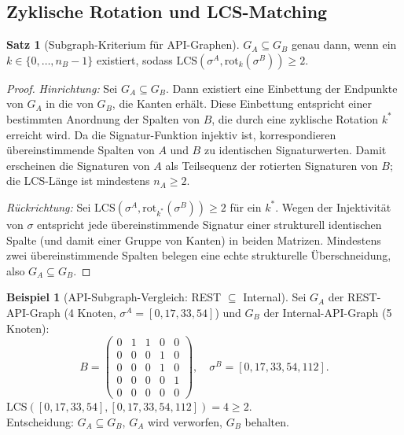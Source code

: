﻿\documentclass[a4paper,12pt]{article}
\theoremstyle{definition}
\newtheorem{beispiel}{Beispiel}
\newtheorem{satz}{Satz}
\begin{document}
\subsection{Zyklische Rotation und LCS-Matching}

\begin{satz}[Subgraph-Kriterium für API-Graphen]
  $G_A \subseteq G_B$ genau dann, wenn ein $k \in \{0, \ldots, n_B - 1\}$
  existiert, sodass $\mathrm{LCS}(\sigma^A, \mathrm{rot}_k(\sigma^B)) \geq 2$.
\end{satz}

\begin{proof}
  \textit{Hinrichtung:} Sei $G_A \subseteq G_B$. Dann existiert eine
  Einbettung der Endpunkte von $G_A$ in die von $G_B$, die Kanten erhält.
  Diese Einbettung entspricht einer bestimmten Anordnung der Spalten von $B$,
  die durch eine zyklische Rotation $k^*$ erreicht wird. Da die Signatur-Funktion
  injektiv ist, korrespondieren übereinstimmende Spalten von $A$ und $B$ zu
  identischen Signaturwerten. Damit erscheinen die Signaturen von $A$ als
  Teilsequenz der rotierten Signaturen von $B$; die LCS-Länge ist mindestens
  $n_A \geq 2$.

  \textit{Rückrichtung:} Sei $\mathrm{LCS}(\sigma^A, \mathrm{rot}_{k^*}(\sigma^B)) \geq 2$
  für ein $k^*$. Wegen der Injektivität von $\sigma$ entspricht jede übereinstimmende
  Signatur einer strukturell identischen Spalte (und damit einer Gruppe von Kanten)
  in beiden Matrizen. Mindestens zwei übereinstimmende Spalten belegen eine echte
  strukturelle Überschneidung, also $G_A \subseteq G_B$.
\end{proof}

\begin{beispiel}[API-Subgraph-Vergleich: REST $\subseteq$ Internal]
  Sei $G_A$ der REST-API-Graph (4 Knoten, $\sigma^A = [0, 17, 33, 54]$) und
  $G_B$ der Internal-API-Graph (5 Knoten):
  \[
    B = \begin{pmatrix}
      0 & 1 & 1 & 0 & 0 \\
      0 & 0 & 0 & 1 & 0 \\
      0 & 0 & 0 & 1 & 0 \\
      0 & 0 & 0 & 0 & 1 \\
      0 & 0 & 0 & 0 & 0
    \end{pmatrix}, \quad \sigma^B = [0, 17, 33, 54, 112].
  \]
  $\mathrm{LCS}([0,17,33,54], [0,17,33,54,112]) = 4 \geq 2$. \\
  Entscheidung: $G_A \subseteq G_B$, $G_A$ wird verworfen, $G_B$ behalten.
\end{beispiel}
\end{document}
